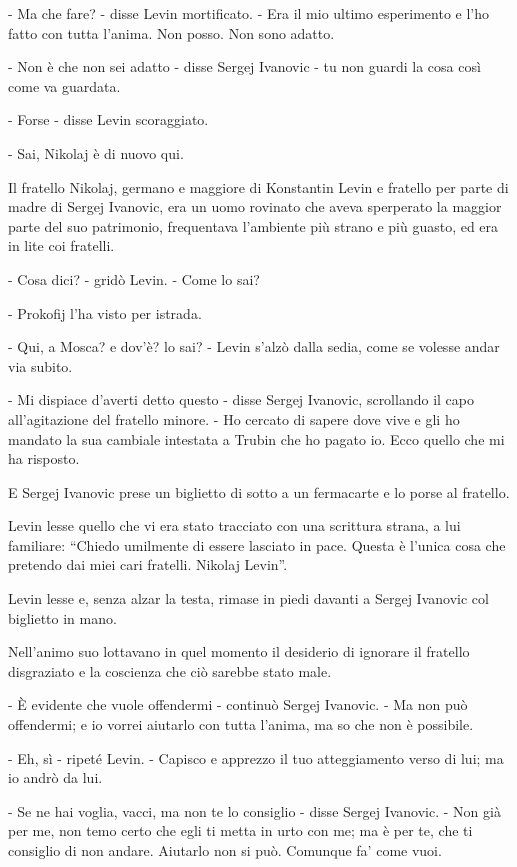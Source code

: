 - Ma che fare? - disse Levin mortificato. - Era il mio ultimo esperimento e l'ho fatto con tutta l'anima. Non posso. Non sono adatto. 

- Non è che non sei adatto - disse Sergej Ivanovic - tu non guardi la cosa così come va guardata. 

- Forse - disse Levin scoraggiato. 

- Sai, Nikolaj è di nuovo qui. 

Il fratello Nikolaj, germano e maggiore di Konstantin Levin e fratello per parte di madre di Sergej Ivanovic, era un uomo rovinato che aveva sperperato la maggior parte del suo patrimonio, frequentava l'ambiente più strano e più guasto, ed era in lite coi fratelli. 

- Cosa dici? - gridò Levin. - Come lo sai? 

- Prokofij l'ha visto per istrada. 

- Qui, a Mosca? e dov'è? lo sai? - Levin s'alzò dalla sedia, come se volesse andar via subito. 

- Mi dispiace d'averti detto questo - disse Sergej Ivanovic, scrollando il capo all'agitazione del fratello minore. - Ho cercato di sapere dove vive e gli ho mandato la sua cambiale intestata a Trubin che ho pagato io. Ecco quello che mi ha risposto. 

E Sergej Ivanovic prese un biglietto di sotto a un fermacarte e lo porse al fratello. 

Levin lesse quello che vi era stato tracciato con una scrittura strana, a lui familiare: ``Chiedo umilmente di essere lasciato in pace. Questa è l'unica cosa che pretendo dai miei cari fratelli. Nikolaj Levin''. 

Levin lesse e, senza alzar la testa, rimase in piedi davanti a Sergej Ivanovic col biglietto in mano. 

Nell'animo suo lottavano in quel momento il desiderio di ignorare il fratello disgraziato e la coscienza che ciò sarebbe stato male. 

- È evidente che vuole offendermi - continuò Sergej Ivanovic. - Ma non può offendermi; e io vorrei aiutarlo con tutta l'anima, ma so che non è possibile. 

- Eh, sì - ripeté Levin. - Capisco e apprezzo il tuo atteggiamento verso di lui; ma io andrò da lui. 

- Se ne hai voglia, vacci, ma non te lo consiglio - disse Sergej Ivanovic. - Non già per me, non temo certo che egli ti metta in urto con me; ma è per te, che ti consiglio di non andare. Aiutarlo non si può. Comunque fa' come vuoi. 

